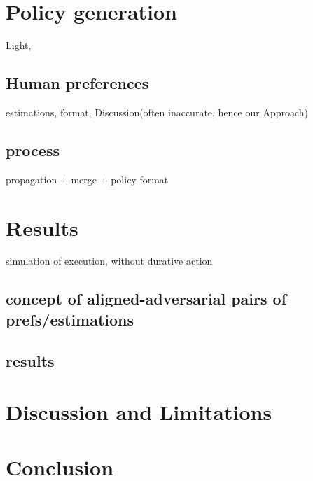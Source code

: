 \section{Policy generation}
Light, 

\subsection{Human preferences}
estimations, format, Discussion(often inaccurate, hence our Approach)

\subsection{process}
propagation + merge + policy format 

\section{Results}
simulation of execution, without durative action

\subsection{concept of aligned-adversarial pairs of prefs/estimations}

\subsection{results}

\section{Discussion and Limitations}
\section{Conclusion}




